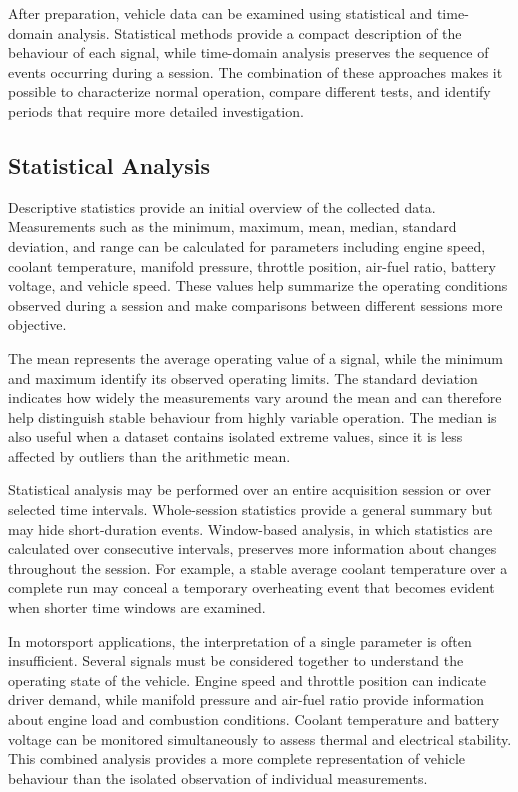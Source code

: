 After preparation, vehicle data can be examined using statistical and time-domain analysis. Statistical methods provide a compact description of the behaviour of each signal, while time-domain analysis preserves the sequence of events occurring during a session. The combination of these approaches makes it possible to characterize normal operation, compare different tests, and identify periods that require more detailed investigation.

\subsection{Statistical Analysis}

Descriptive statistics provide an initial overview of the collected data. Measurements such as the minimum, maximum, mean, median, standard deviation, and range can be calculated for parameters including engine speed, coolant temperature, manifold pressure, throttle position, air-fuel ratio, battery voltage, and vehicle speed. These values help summarize the operating conditions observed during a session and make comparisons between different sessions more objective.

The mean represents the average operating value of a signal, while the minimum and maximum identify its observed operating limits. The standard deviation indicates how widely the measurements vary around the mean and can therefore help distinguish stable behaviour from highly variable operation. The median is also useful when a dataset contains isolated extreme values, since it is less affected by outliers than the arithmetic mean.

Statistical analysis may be performed over an entire acquisition session or over selected time intervals. Whole-session statistics provide a general summary but may hide short-duration events. Window-based analysis, in which statistics are calculated over consecutive intervals, preserves more information about changes throughout the session. For example, a stable average coolant temperature over a complete run may conceal a temporary overheating event that becomes evident when shorter time windows are examined.

In motorsport applications, the interpretation of a single parameter is often insufficient. Several signals must be considered together to understand the operating state of the vehicle. Engine speed and throttle position can indicate driver demand, while manifold pressure and air-fuel ratio provide information about engine load and combustion conditions. Coolant temperature and battery voltage can be monitored simultaneously to assess thermal and electrical stability. This combined analysis provides a more complete representation of vehicle behaviour than the isolated observation of individual measurements.

